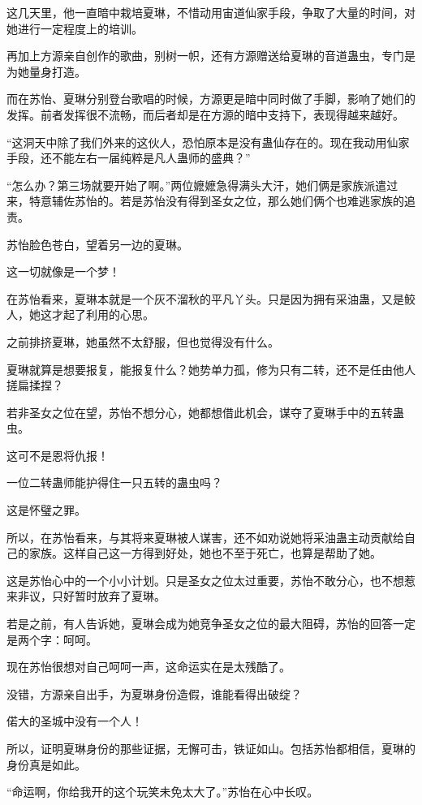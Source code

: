 \begin{this_body}
这几天里，他一直暗中栽培夏琳，不惜动用宙道仙家手段，争取了大量的时间，对她进行一定程度上的培训。

再加上方源亲自创作的歌曲，别树一帜，还有方源赠送给夏琳的音道蛊虫，专门是为她量身打造。

而在苏怡、夏琳分别登台歌唱的时候，方源更是暗中同时做了手脚，影响了她们的发挥。前者发挥很不流畅，而后者却是在方源的暗中支持下，表现得越来越好。

“这洞天中除了我们外来的这伙人，恐怕原本是没有蛊仙存在的。现在我动用仙家手段，还不能左右一届纯粹是凡人蛊师的盛典？”

“怎么办？第三场就要开始了啊。”两位嬷嬷急得满头大汗，她们俩是家族派遣过来，特意辅佐苏怡的。若是苏怡没有得到圣女之位，那么她们俩个也难逃家族的追责。

苏怡脸色苍白，望着另一边的夏琳。

这一切就像是一个梦！

在苏怡看来，夏琳本就是一个灰不溜秋的平凡丫头。只是因为拥有采油蛊，又是鲛人，她这才起了利用的心思。

之前排挤夏琳，她虽然不太舒服，但也觉得没有什么。

夏琳就算是想要报复，能报复什么？她势单力孤，修为只有二转，还不是任由他人搓扁揉捏？

若非圣女之位在望，苏怡不想分心，她都想借此机会，谋夺了夏琳手中的五转蛊虫。

这可不是恩将仇报！

一位二转蛊师能护得住一只五转的蛊虫吗？

这是怀璧之罪。

所以，在苏怡看来，与其将来夏琳被人谋害，还不如劝说她将采油蛊主动贡献给自己的家族。这样自己这一方得到好处，她也不至于死亡，也算是帮助了她。

这是苏怡心中的一个小小计划。只是圣女之位太过重要，苏怡不敢分心，也不想惹来非议，只好暂时放弃了夏琳。

若是之前，有人告诉她，夏琳会成为她竞争圣女之位的最大阻碍，苏怡的回答一定是两个字：呵呵。

现在苏怡很想对自己呵呵一声，这命运实在是太残酷了。

没错，方源亲自出手，为夏琳身份造假，谁能看得出破绽？

偌大的圣城中没有一个人！

所以，证明夏琳身份的那些证据，无懈可击，铁证如山。包括苏怡都相信，夏琳的身份真是如此。

“命运啊，你给我开的这个玩笑未免太大了。”苏怡在心中长叹。


\end{this_body}
